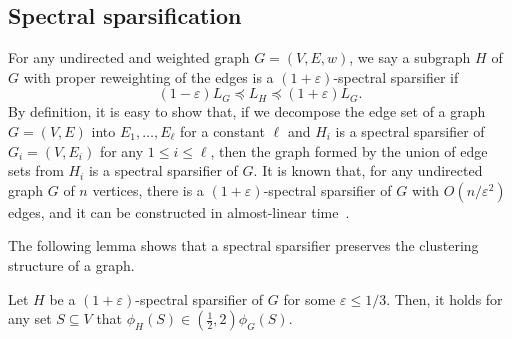 



\subsection{Spectral sparsification}   For any  undirected and weighted graph $G=(V,E,w)$, we say a subgraph $H$ of $G$ with proper reweighting of the edges is a $(1+\varepsilon)$-spectral sparsifier if
\begin{equation}\label{eq:ssproperty}
(1-\varepsilon)L_G  \preceq  L_{H} \preceq  (1+\varepsilon)L_G.
\end{equation}
By definition, it is easy to show that, if we decompose the edge set of a graph $G=(V,E)$ into $E_1,\ldots,E_{\ell}$ for a constant
$\ell$ and $H_i$ is a  spectral sparsifier of $G_i=(V, E_i)$ for any $1\leq i\leq \ell$, then the graph formed by the union of  edge sets from $H_i$ is a spectral sparsifier of $G$.  It is known that, for any undirected graph $G$ of $n$ vertices, there is a $(1+\varepsilon)$-spectral sparsifier of $G$ with $O(n/\varepsilon^2)$ edges, and it can be constructed in almost-linear time~\cite{LS15}. 

The following lemma shows that a spectral sparsifier preserves the clustering structure of a graph. 

 

\begin{lem}\label{lem:sssubset}
Let $H$ be a $(1+\varepsilon)$-spectral sparsifier of $G$ for some $\varepsilon\leq 1/3$. Then, it holds for any set $S\subseteq V$ that   $\phi_H(S)\in \left(\frac{1}{2},2\right)\phi_G(S)$.
\end{lem}

